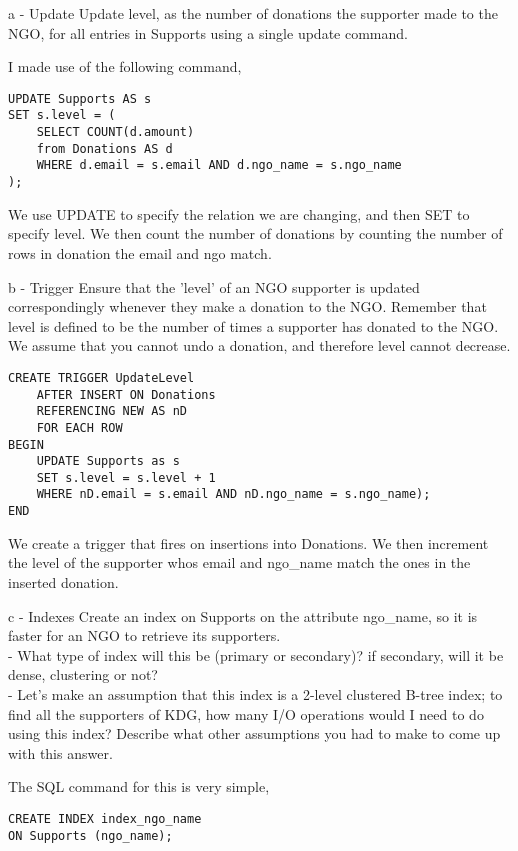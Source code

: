 \documentclass[working, oneside]{../../Preambles/tuftebook}
\begin{document}
\begin{subexercise}{a - Update}
Update level, as the number of donations the supporter made to the NGO, for all entries in Supports using a single update command.
\end{subexercise}
I made use of the following command,
\begin{lstlisting}
UPDATE Supports AS s
SET s.level = (
    SELECT COUNT(d.amount)
    from Donations AS d
    WHERE d.email = s.email AND d.ngo_name = s.ngo_name
);
\end{lstlisting}
We use UPDATE to specify the relation we are changing, and then SET to specify level. We then count the number of donations by counting the number of rows in donation the email and ngo match.
\begin{subexercise}{b - Trigger}
Ensure that the 'level' of an NGO supporter is updated correspondingly whenever they make a donation to the NGO. Remember that level is defined to be the number of times a supporter has donated to the NGO. We assume that you cannot undo a donation, and therefore level cannot decrease.
\end{subexercise}
\begin{lstlisting}
CREATE TRIGGER UpdateLevel
    AFTER INSERT ON Donations
    REFERENCING NEW AS nD
    FOR EACH ROW
BEGIN
    UPDATE Supports as s
    SET s.level = s.level + 1
    WHERE nD.email = s.email AND nD.ngo_name = s.ngo_name);
END
\end{lstlisting}
We create a trigger that fires on insertions into Donations. We then increment the level of the supporter whos email and ngo\_name match the ones in the inserted donation.
\begin{subexercise}{c - Indexes}
Create an index on Supports on the attribute ngo\_name, so it is faster for an NGO to retrieve
its supporters.\\
- What type of index will this be (primary or secondary)? if secondary, will it be dense,
clustering or not?\\
- Let’s make an assumption that this index is a 2-level clustered B-tree index; to find all the supporters of KDG, how many I/O operations would I need to do using this index? Describe what other assumptions you had to make to come up with this
answer.
\end{subexercise}
The SQL command for this is very simple,
\begin{lstlisting}
CREATE INDEX index_ngo_name
ON Supports (ngo_name);
\end{lstlisting}
\end{document}
